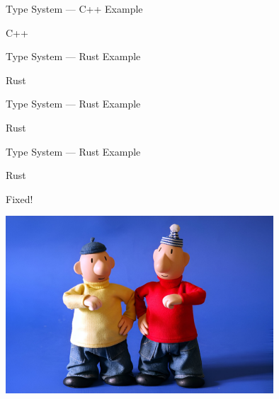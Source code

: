 \documentclass[10pt,aspectratio=169]{beamer}
\begin{document}
\begin{frame}{Type System --- C++ Example}
    \begin{block}{C++}        
        
    \end{block}
\end{frame}

\begin{frame}{Type System --- Rust Example}
   \begin{block}{Rust}        
        
    \end{block}
\end{frame}

\begin{frame}{Type System --- Rust Example}
   \begin{block}{Rust}        
        
    \end{block}
\end{frame}

\begin{frame}{Type System --- Rust Example}
   \begin{block}{Rust}        
        
    \end{block}
\end{frame}

\begin{frame}{Fixed!}
    \begin{center}
        \includegraphics[width=0.75\textwidth]{img/pat_a_mat.jpeg}
    \end{center}    
\end{frame}
\end{document}
